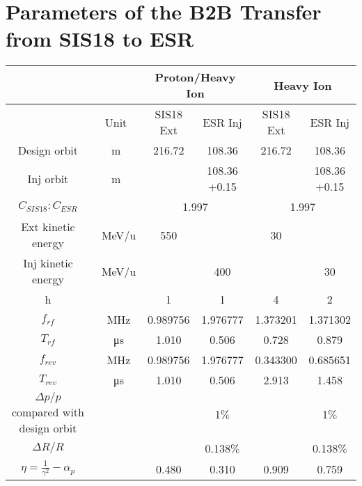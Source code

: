 \newpage
\section{Parameters of the B2B Transfer from SIS18 to ESR}
\label{sec:18toESR}



% 
    \begin{longtable}{ | c | c | c | c | c | c |}
    \hline
		\rowcolor[gray]{0.8}
     	 &  & \multicolumn{2}{c|}{Proton/Heavy Ion} & \multicolumn{2}{c|}{Heavy Ion} \\ \hline
		 & Unit &	SIS18 Ext & ESR Inj & SIS18 Ext &	ESR Inj\\ \hline
Design orbit &	m &	 216.72&108.36&	216.72&108.36	\\ \hline
Inj orbit &	m &	 &\tabincell{c}{108.36\\+0.15}&	&\tabincell{c}{108.36\\+0.15}	\\ \hline
$C_{SIS18}:C_{ESR}$&	&	\multicolumn{2}{c|}{1.997}&\multicolumn{2}{c|}{1.997}	\\ \hline
\tabincell{c}{Ext kinetic\\ energy}&	\SI{}{\MeV/\atomicmassunit}&	550 & &30&	\\ \hline
\tabincell{c}{Inj kinetic\\ energy}&	\SI{}{\MeV/\atomicmassunit}&	&400&	&30	\\ \hline
  h&	&1&1&4&2	\\ \hline
$f_{rf}$&\SI{}{\MHz}&	0.989756&1.976777&1.373201&1.371302	\\ \hline
$T_{rf}$&\SI{}{\us}&	1.010&0.506&0.728&0.879\\ \hline
$f_{rev}$&\SI{}{\MHz}&	0.989756&1.976777&0.343300&0.685651\\ \hline
$T_{rev}$&\SI{}{\us}&	1.010&0.506&2.913&1.458\\ \hline
\tabincell{c}{$\Delta p/p$ compared \\with design orbit}&	&&1$\%$&&1$\%$\\ \hline
$\Delta R/R$&	&&0.138$\%$&&0.138$\%$\\ \hline
$\eta=\frac{1}{\gamma^2}-\alpha_p$ &	&0.480	&0.310&	0.909&	0.759\\ \hline

\end{longtable}
